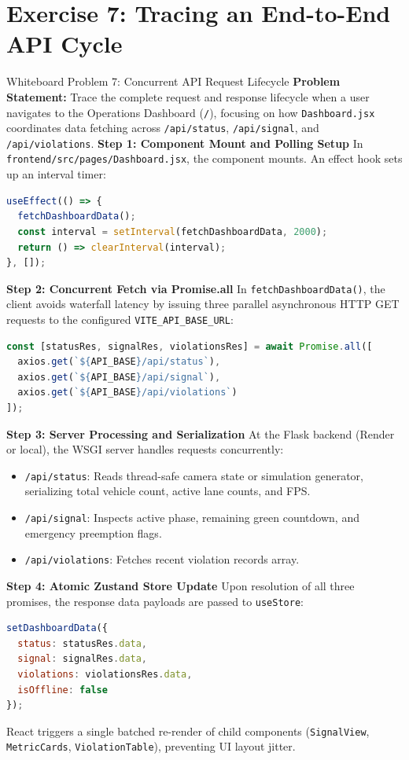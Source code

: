 \documentclass[11pt,a4paper,oneside]{report}
\begin{document}
\section{Exercise 7: Tracing an End-to-End API Cycle}
\label{sec:wb_tracing}

\begin{interviewq}{Whiteboard Problem 7: Concurrent API Request Lifecycle}
\textbf{Problem Statement:}
Trace the complete request and response lifecycle when a user navigates to the Operations Dashboard (\texttt{/}), focusing on how \texttt{Dashboard.jsx} coordinates data fetching across \texttt{/api/status}, \texttt{/api/signal}, and \texttt{/api/violations}.
\tcblower
\textbf{Step 1: Component Mount and Polling Setup}
In \texttt{frontend/src/pages/Dashboard.jsx}, the component mounts. An effect hook sets up an interval timer:
\begin{lstlisting}[language=JavaScript]
useEffect(() => {
  fetchDashboardData();
  const interval = setInterval(fetchDashboardData, 2000);
  return () => clearInterval(interval);
}, []);
\end{lstlisting}

\textbf{Step 2: Concurrent Fetch via Promise.all}
In \texttt{fetchDashboardData()}, the client avoids waterfall latency by issuing three parallel asynchronous HTTP GET requests to the configured \texttt{VITE\_API\_BASE\_URL}:
\begin{lstlisting}[language=JavaScript]
const [statusRes, signalRes, violationsRes] = await Promise.all([
  axios.get(`${API_BASE}/api/status`),
  axios.get(`${API_BASE}/api/signal`),
  axios.get(`${API_BASE}/api/violations`)
]);
\end{lstlisting}

\textbf{Step 3: Server Processing and Serialization}
At the Flask backend (Render or local), the WSGI server handles requests concurrently:
\begin{itemize}
    \item \texttt{/api/status}: Reads thread-safe camera state or simulation generator, serializing total vehicle count, active lane counts, and FPS.
    \item \texttt{/api/signal}: Inspects active phase, remaining green countdown, and emergency preemption flags.
    \item \texttt{/api/violations}: Fetches recent violation records array.
\end{itemize}

\textbf{Step 4: Atomic Zustand Store Update}
Upon resolution of all three promises, the response data payloads are passed to \texttt{useStore}:
\begin{lstlisting}[language=JavaScript]
setDashboardData({
  status: statusRes.data,
  signal: signalRes.data,
  violations: violationsRes.data,
  isOffline: false
});
\end{lstlisting}
React triggers a single batched re-render of child components (\texttt{SignalView}, \texttt{MetricCards}, \texttt{ViolationTable}), preventing UI layout jitter.
\end{interviewq}
\end{document}
